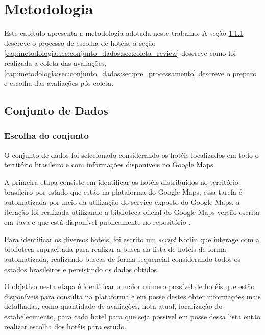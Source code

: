 \chapter{Metodologia}
\label{cap:metodologia}

Este capítulo apresenta a metodologia adotada neste trabalho. A seção \ref{cap:metodologia:sec:conjunto_dados:sec:escolha_conjunto} descreve o processo de escolha de hotéis; a seção \ref{cap:metodologia:sec:conjunto_dados:sec:coleta_review} descreve como foi realizada a coleta das avaliações, \ref{cap:metodologia:sec:conjunto_dados:sec:pre_processamento} descreve o preparo e escolha das avaliações pós coleta.

\section{Conjunto de Dados}
\label{cap:metodologia:sec:conjunto_dados}

\subsection{Escolha do conjunto}
\label{cap:metodologia:sec:conjunto_dados:sec:escolha_conjunto}

O conjunto de dados foi selecionado considerando os hotéis localizados em todo o território brasileiro e com informações disponíveis no Google Maps.

A primeira etapa consiste em identificar os hotéis distribuídos no território brasileiro por estado que estão na plataforma do Google Maps, essa tarefa é automatizada por meio da utilização do serviço exposto do Google Maps, a iteração foi realizada utilizando a biblioteca oficial do Google Maps versão escrita em Java e que está disponível publicamente no repositório .

Para identificar os diversos hotéis, foi escrito um \emph{script} Kotlin  que interage com a biblioteca supracitada para realizar a busca da lista de hotéis de forma automatizada, realizando buscas de forma sequencial considerando todos os estados brasileiros e persistindo os dados obtidos.

O objetivo nesta etapa é identificar o maior número possível de hotéis que estão disponíveis para consulta na plataforma e em posse destes obter informações mais detalhadas, como quantidade de avaliações, nota atual, localização do estabelecimento, para cada hotel para que seja possivel em posse dessa lista então realizar escolha dos hotéis para estudo.


